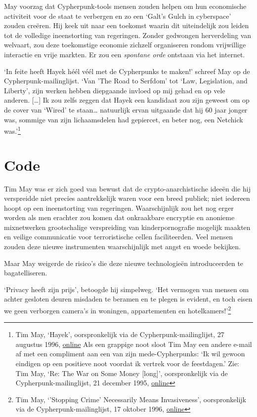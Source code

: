 \documentclass[
  a5paper,
  smalldemyvopaper,11pt,twoside,onecolumn,openright,extrafontsizes]{memoir}
\begin{document}
May voorzag dat Cypherpunk-tools mensen zouden helpen om hun economische
activiteit voor de staat te verbergen en zo een `Galt's Gulch in
cyberspace' zouden creëren. Hij keek uit naar een toekomst waarin dit
uiteindelijk zou leiden tot de volledige ineenstorting van regeringen.
Zonder gedwongen herverdeling van welvaart, zou deze toekomstige
economie zichzelf organiseren rondom vrijwillige interactie en vrije
markten. Er zou een \emph{spontane orde} ontstaan via het internet.

`In feite heeft Hayek héél véél met de Cypherpunks te maken!' schreef
May op de Cypherpunk-mailinglijst. `Van 'The Road to Serfdom' tot `Law,
Legislation, and Liberty', zijn werken hebben diepgaande invloed op mij
gehad en op vele anderen. {[}\ldots{]} Ik zou zelfs zeggen dat Hayek een
kandidaat zou zijn geweest om op de cover van `Wired' te staan\ldots{}
natuurlijk ervan uitgaande dat hij 60 jaar jonger was, sommige van zijn
lichaamsdelen had gepiercet, en beter nog, een Netchick was.'\footnote{Tim
  May, `Hayek', oorspronkelijk via de Cypherpunk-mailinglijst, 27
  augustus 1996,
  \href{https://cypherpunks.venona.com/date/1996/08/msg02102.html}{online}
  Als een grappige noot sloot Tim May een andere e-mail af met een
  compliment aan een van zijn mede-Cypherpunks: `Ik wil gewoon eindigen
  op een positieve noot voordat ik vertrek voor de feestdagen.' Zie: Tim
  May, `Re: The War on Some Money {[}long{]}', oorspronkelijk via de
  Cypherpunk-mailinglijst, 21 december 1995,
  \href{https://cypherpunks.venona.com/date/1995/12/msg01044.html}{online}}

\section{Code}\label{code}

Tim May was er zich goed van bewust dat de crypto-anarchistische ideeën
die hij verspreidde niet precies aantrekkelijk waren voor een breed
publiek; niet iedereen hoopt op een ineenstorting van regeringen.
Waarschijnlijk zou het nog erger worden als men erachter zou komen dat
onkraakbare encryptie en anonieme mixnetwerken grootschalige
verspreiding van kinderpornografie mogelijk maakten en veilige
communicatie voor terroristische cellen faciliteerden. Veel mensen
zouden deze nieuwe instrumenten waarschijnlijk met angst en woede
bekijken.

Maar May weigerde de risico's die deze nieuwe technologieën
introduceerden te bagatelliseren.

`Privacy heeft zijn prijs', betoogde hij simpelweg. `Het vermogen van
mensen om achter gesloten deuren misdaden te beramen en te plegen is
evident, en toch eisen we geen verborgen camera's in woningen,
appartementen en hotelkamers!'\footnote{Tim May, `'Stopping Crime'
  Necessarily Means Invasiveness', oorspronkelijk via de
  Cypherpunk-mailinglijst, 17 oktober 1996,
  \href{https://cypherpunks.venona.com/date/1996/10/msg01269.html}{online}}
\end{document}
